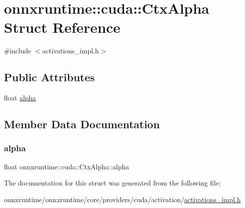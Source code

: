 \hypertarget{structonnxruntime_1_1cuda_1_1CtxAlpha}{}\section{onnxruntime\+:\+:cuda\+:\+:Ctx\+Alpha Struct Reference}
\label{structonnxruntime_1_1cuda_1_1CtxAlpha}


{\ttfamily \#include $<$activations\+\_\+impl.\+h$>$}

\subsection*{Public Attributes}
\begin{DoxyCompactItemize}
\item 
float \mbox{\hyperlink{structonnxruntime_1_1cuda_1_1CtxAlpha_aa22885e9606a556d5434e66772eebaad}{alpha}}
\end{DoxyCompactItemize}


\subsection{Member Data Documentation}
\mbox{\label{structonnxruntime_1_1cuda_1_1CtxAlpha_aa22885e9606a556d5434e66772eebaad}} 
\subsubsection{\texorpdfstring{alpha}{alpha}}
{\footnotesize\ttfamily float onnxruntime\+::cuda\+::\+Ctx\+Alpha\+::alpha}



The documentation for this struct was generated from the following file\+:\begin{DoxyCompactItemize}
\item 
onnxruntime/onnxruntime/core/providers/cuda/activation/\mbox{\hyperlink{activations__impl_8h}{activations\+\_\+impl.\+h}}\end{DoxyCompactItemize}
